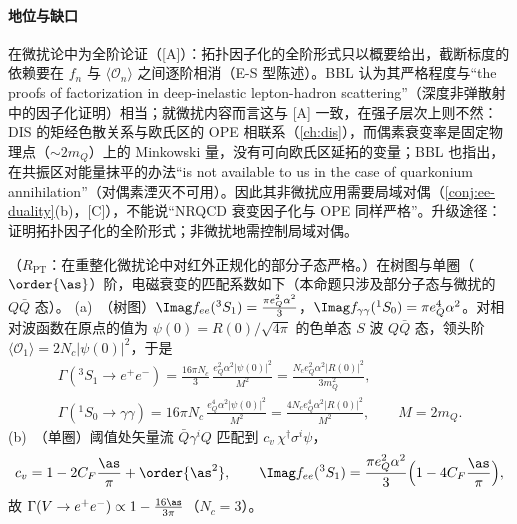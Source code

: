 \paragraph{地位与缺口}
在微扰论中为全阶论证（[A]）：拓扑因子化的全阶形式只以概要给出，截断标度的依赖要在 $f_n$ 与 $\langle\mathcal O_n\rangle$ 之间逐阶相消（E-S 型陈述）。BBL 认为其严格程度与“the proofs of factorization in deep-inelastic lepton-hadron scattering”（深度非弹散射中的因子化证明）相当\cite[第~VI.A~节]{BodwinBraatenLepage1995}；就微扰内容而言这与 [A] 一致，在强子层次上则不然：DIS 的矩经色散关系与欧氏区的 OPE 相联系（\cref{ch:dis}），而偶素衰变率是固定物理点（$\sim2m_Q$）上的 Minkowski 量，没有可向欧氏区延拓的变量；BBL 也指出，在共振区对能量抹平的办法“is not available to us in the case of quarkonium annihilation”（对偶素湮灭不可用）\cite[第~II.E~节]{BodwinBraatenLepage1995}。因此其非微扰应用需要局域对偶（\cref{conj:ee-duality}(b)，[C]），不能说“NRQCD 衰变因子化与 OPE 同样严格”。升级途径：证明拓扑因子化的全阶形式；非微扰地需控制局域对偶。

\begin{proposition}\label{prop:heavy-nrqcd-matching}
（$R_{\mathrm{PT}}$：在重整化微扰论中对红外正规化的部分子态严格。）在树图与单圈（$\order{\as}$）阶，电磁衰变的匹配系数如下（本命题只涉及部分子态与微扰的 $Q\bar Q$ 态）。
(a)~（树图）$\Imag f_{ee}({}^3S_1)=\frac{\pi e_Q^2\alpha^2}{3}$，$\Imag f_{\gamma\gamma}({}^1S_0)=\pi e_Q^4\alpha^2$。对相对波函数在原点的值为 $\psi(0)=R(0)/\sqrt{4\pi}$ 的色单态 $S$ 波 $Q\bar Q$ 态，领头阶 $\langle\mathcal O_1\rangle=2N_c|\psi(0)|^2$，于是
\begin{equation}\label{eq:heavy-EMwidths}
\begin{gathered}
\Gamma({}^3S_1\to e^+e^-)=\frac{16\pi N_c}{3}\,\frac{e_Q^2\alpha^2|\psi(0)|^2}{M^2}=\frac{N_ce_Q^2\alpha^2|R(0)|^2}{3m_Q^2},\\
\Gamma({}^1S_0\to\gamma\gamma)=16\pi N_c\,\frac{e_Q^4\alpha^2|\psi(0)|^2}{M^2}=\frac{4N_ce_Q^4\alpha^2|R(0)|^2}{M^2},\qquad M=2m_Q .
\end{gathered}
\end{equation}
(b)~（单圈）阈值处矢量流 $\bar Q\gamma^iQ$ 匹配到 $c_v\,\chi^\dagger\sigma^i\psi$，
\begin{equation}\label{eq:heavy-cv}
c_v=1-2C_F\frac{\as}{\pi}+\order{\as^2},\qquad
\Imag f_{ee}({}^3S_1)=\frac{\pi e_Q^2\alpha^2}{3}\Big(1-4C_F\frac{\as}{\pi}\Big),
\end{equation}
故 $\Gamma(V\to e^+e^-)\propto1-\frac{16\as}{3\pi}$（$N_c=3$）。
\end{proposition}

